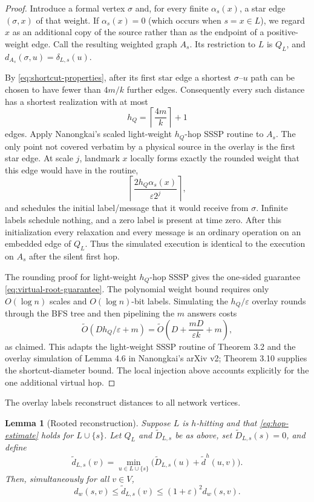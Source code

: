 \documentclass[11pt]{article}
\newtheorem{lemma}[theorem]{Lemma}
\theoremstyle{definition}
\newcommand{\eps}{\varepsilon}
\newcommand{\dist}{d_w}
\newcommand{\wtO}{\widetilde O}
\begin{document}
\begin{proof}
Introduce a formal vertex $\sigma$ and, for every finite $\alpha_s(x)$, a
star edge $(\sigma,x)$ of that weight.  If $\alpha_s(x)=0$ (which occurs when
$s=x\in L$), we regard $x$ as an additional copy of the source rather than as
the endpoint of a positive-weight edge.  Call the resulting weighted graph
$A_s$.  Its restriction to $L$ is $Q_L$, and
$d_{A_s}(\sigma,u)=\delta_{L,s}(u)$.

By \eqref{eq:shortcut-properties}, after its first star edge a shortest
$\sigma$--$u$ path can be chosen to have fewer than $4m/k$ further edges.
Consequently every such distance has a shortest realization with at most
\[
  h_Q=\left\lceil\frac{4m}{k}\right\rceil+1
\]
edges.  Apply Nanongkai's scaled light-weight $h_Q$-hop SSSP routine to $A_s$.
The only point not covered verbatim by a physical source in the overlay is the
first star edge.  At scale $j$, landmark $x$ locally forms exactly the rounded
weight that this edge would have in the routine,
\[
  \left\lceil
    \frac{2h_Q\alpha_s(x)}{\eps 2^j}
  \right\rceil,
\]
and schedules the initial label/message that it would receive from $\sigma$.
Infinite labels schedule nothing, and a zero label is present at time zero.
After this initialization every relaxation and every message is an ordinary
operation on an embedded edge of $Q_L$.  Thus the simulated execution is
identical to the execution on $A_s$ after the silent first hop.

The rounding proof for light-weight $h_Q$-hop SSSP gives the one-sided
guarantee \eqref{eq:virtual-root-guarantee}.  The polynomial weight bound
requires only $O(\log n)$ scales and $O(\log n)$-bit labels.  Simulating the
$h_Q/\eps$ overlay rounds through the BFS tree and then pipelining the $m$
answers costs
\[
  \wtO(Dh_Q/\eps+m)
  =\wtO\!\left(D+\frac{mD}{\eps k}+m\right),
\]
as claimed.  This adapts the light-weight SSSP routine of Theorem 3.2 and the
overlay simulation of Lemma 4.6 in Nanongkai's arXiv v2; Theorem 3.10 supplies
the shortcut-diameter bound.  The local injection above accounts explicitly
for the one additional virtual hop.
\end{proof}

The overlay labels reconstruct distances to all network vertices.

\begin{lemma}[Rooted reconstruction]
\label{lem:rooted-reconstruction}
Suppose $L$ is $h$-hitting and that \eqref{eq:hop-estimate} holds for
$L\cup\{s\}$.  Let $Q_L$ and $\widetilde D_{L,s}$ be as above, set
$\widetilde D_{L,s}(s)=0$, and define
\[
  \widetilde d_{L,s}(v)
  =\min_{u\in L\cup\{s\}}
    \bigl(\widetilde D_{L,s}(u)+\widetilde d^h(u,v)\bigr).
  \tag{7}\label{eq:rooted-reconstruction}
\]
Then, simultaneously for all $v\in V$,
\[
  \dist(s,v)\leq\widetilde d_{L,s}(v)
  \leq(1+\eps)^2\dist(s,v).
  \tag{8}\label{eq:rooted-guarantee}
\]
\end{lemma}
\end{document}
